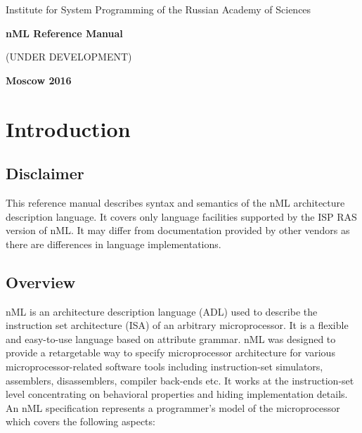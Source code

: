 \documentclass[oneside,final,14pt]{extreport}
\begin{document}
\begin{titlepage}
\begin{center}
\Large{Institute for System Programming of the Russian Academy of Sciences}

\vfill


\bf\Large{nML Reference Manual}

(UNDER DEVELOPMENT)

\vfill

\bf
Moscow 2016
\end{center}
\end{titlepage}


\newpage
{} %
\tableofcontents

\newpage


\chapter{Introduction}

\section{Disclaimer}

This reference manual describes syntax and semantics of the nML architecture
description language. It covers only language facilities supported by the ISP RAS
version of nML. It may differ from documentation provided by other vendors as
there are differences in language implementations.

\section{Overview}

nML is an architecture description language (ADL) used to describe the
instruction set architecture (ISA) of an arbitrary microprocessor. It is a
flexible and easy-to-use language based on attribute grammar. nML was designed
to provide a retargetable way to specify microprocessor architecture for
various microprocessor-related software tools including instruction-set
simulators, assemblers, disassemblers, compiler back-ends etc. It works at
the instruction-set level concentrating on behavioral properties and hiding
implementation details. An nML specification represents a programmer's model
of the microprocessor which covers the following aspects:
\end{document}
